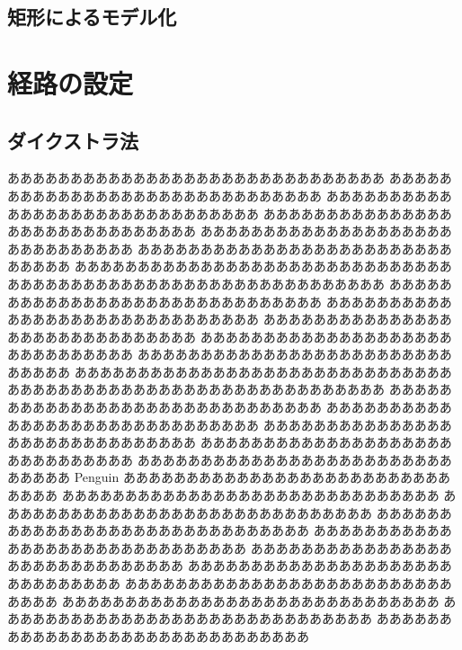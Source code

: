 \subsection{矩形によるモデル化}

\section{経路の設定}

\subsection{ダイクストラ法}



ああああああああああああああああああああああああああああああ
ああああああああああああああああああああああああああああああ
ああああああああああああああああああああああああああああああ
ああああああああああああああああああああああああああああああ
ああああああああああああああああああああああああああああああ
ああああああああああああああああああああああああああああああ
ああああああああああああああああああああああああああああああ
ああああああああああああああああああああああああああああああ
ああああああああああああああああああああああああああああああ
ああああああああああああああああああああああああああああああ
%
ああああああああああああああああああああああああああああああ
ああああああああああああああああああああああああああああああ
ああああああああああああああああああああああああああああああ
ああああああああああああああああああああああああああああああ
ああああああああああああああああああああああああああああああ
ああああああああああああああああああああああああああああああ
ああああああああああああああああああああああああああああああ
ああああああああああああああああああああああああああああああ
ああああああああああああああああああああああああああああああ
ああああああああああああああああああああああああああああああ
%
Penguin
ああああああああああああああああああああああああああああああ
ああああああああああああああああああああああああああああああ
ああああああああああああああああああああああああああああああ
ああああああああああああああああああああああああああああああ
ああああああああああああああああああああああああああああああ
ああああああああああああああああああああああああああああああ
ああああああああああああああああああああああああああああああ
ああああああああああああああああああああああああああああああ
ああああああああああああああああああああああああああああああ
ああああああああああああああああああああああああああああああ
%
ああああああああああああああああああああああああああああああ
